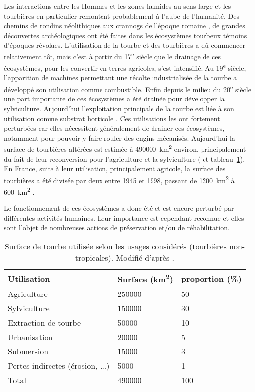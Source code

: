 Les interactions entre les Hommes et les zones humides au sens large et les tourbières en particulier remontent probablement à l'aube de l'humanité.
Des chemins de rondins néolithiques aux crannogs de l'époque romaine \citep{buckland1993}, de grandes découvertes archéologiques ont été faites dans les écosystèmes tourbeux témoins d'époques révolues.
L’utilisation de la tourbe et des tourbières a dû commencer relativement tôt, mais c'est à partir du 17\textsuperscript{e} siècle que le drainage de ces écosystèmes, pour les convertir en terres agricoles, s'est intensifié.
Au 19\textsuperscript{e} siècle, l'apparition de machines permettant une récolte industrialisée de la tourbe a développé son utilisation comme combustible.
Enfin depuis le milieu du 20\textsuperscript{e} siècle une part importante de ces écosystèmes a été drainée pour développer la sylviculture.
Aujourd'hui l'exploitation principale de la tourbe est liée à son utilisation comme substrat horticole \citep{lappalainen1996,chapman2003}.
Ces utilisations les ont fortement perturbées car elles nécessitent généralement de drainer ces écosystèmes, notamment pour pouvoir y faire rouler des engins mécanisés.
Aujourd'hui la surface de tourbières altérées est estimée à \SI{490000}{\square\kilo\metre} environ, principalement du fait de leur reconversion pour l'agriculture et la sylviculture (\citealp{joosten2002} et tableau~\ref{table:tourbeUsage}).
En France, suite à leur utilisation, principalement agricole, la surface des tourbières a été divisée par deux entre 1945 et 1998, passant de \SI{1200}{\square\kilo\meter} à \SI{600}{\square\kilo\meter} \citep{lappalainen1996,manneville1999}.

Le fonctionnement de ces écosystèmes a donc été et est encore perturbé par différentes activités humaines.
Leur importance est cependant reconnue et elles sont l'objet de nombreuses actions de préservation et/ou de réhabilitation.
\begin{table}[]
\centering
\caption{Surface de tourbe utilisée selon les usages considérés (tourbières non-tropicales). Modifié d'après \citet{joosten2002}.}
\label{table:tourbeUsage}
\begin{tabular}{lll}\toprule
Utilisation & Surface (\si{\square\kilo\meter})  & proportion (\%) \\ \midrule
Agriculture & \num{250000} & \num{50} \\ 
Sylviculture & \num{150000} & \num{30}\\ 
Extraction de tourbe & \num{50000} & \num{10}\\ 
Urbanisation & \num{20000} & \num{5}\\ 
Submersion & \num{15000} & \num{3}\\ 
Pertes indirectes (érosion, ...) & \num{5000} & \num{1}\\[1ex]
Total & \num{490000} & \num{100}\\
\bottomrule
\end{tabular}
\end{table}


